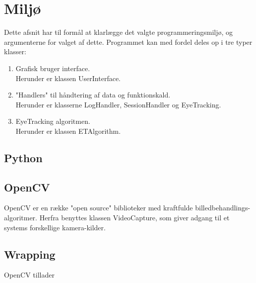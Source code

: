 \documentclass[softwarearkitektur.tex]{subfiles}
\begin{document}
\section{Miljø}
Dette afsnit har til formål at klarlægge det valgte programmeringsmiljø, og argumenterne for valget af dette. 
Programmet kan med fordel deles op i tre typer klasser:
\begin{enumerate}
	\item Grafisk bruger interface. \\
	Herunder er klassen UserInterface.
	\item "Handlers" til håndtering af data og funktionskald. \\
	Herunder er klasserne LogHandler, SessionHandler og EyeTracking.
	\item EyeTracking algoritmen. \\
	Herunder er klassen ETAlgorithm.
\end{enumerate}

\subsection{Python}



\subsection{OpenCV}
OpenCV er en række "open source" biblioteker med kraftfulde billedbehandlings-algoritmer. 
Herfra benyttes klassen VideoCapture, som giver adgang til et systems forskellige kamera-kilder. 

\subsection{Wrapping}
OpenCV tillader 
\end{document}
